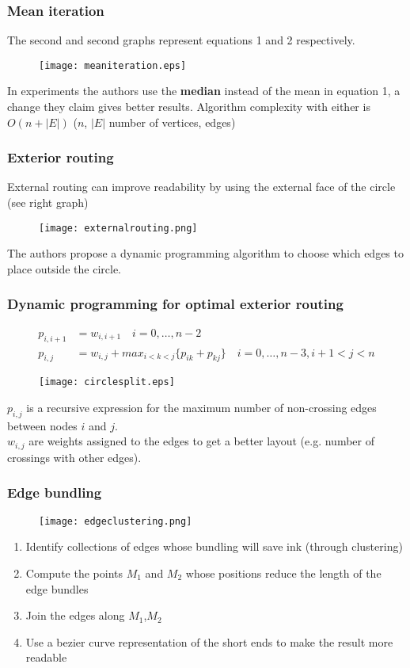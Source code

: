 \documentclass[12pt]{beamer}
\begin{document}
\begin{frame}
	\frametitle{Mean iteration}
	The second and second graphs represent equations 1 and 2 respectively. \\
	\begin{figure}
		\texttt{[image: meaniteration.eps]}
	\end{figure}
	In experiments the authors use the \textbf{median} instead of the mean in equation 1, a change they claim gives better results. Algorithm complexity with either is $O(n + |E|)$ ($n$, $|E|$ number of vertices, edges)
	
\end{frame}

\begin{frame}
	\frametitle{Exterior routing}
	External routing can improve readability by using the external face of the circle (see right graph)
	\begin{figure}
		\texttt{[image: externalrouting.png]}
	\end{figure}

	The authors propose a dynamic programming algorithm to choose which edges to place outside the circle.
\end{frame}

\begin{frame}
	\frametitle{Dynamic programming for optimal exterior routing}
	\footnotesize {
	\begin{align*}
		p_{i,i+1} &= w_{i,i+1} \quad i = 0, \ldots, n - 2 \\
		p_{i,j} &= w_{i,j} + max_{i<k<j}\{p_{ik} + p_{kj}\} \quad i = 0,\ldots,n-3, i + 1 < j < n
	\end{align*}
	}
	\begin{figure}
		\texttt{[image: circlesplit.eps]}
	\end{figure}
	$p_{i,j}$ is a recursive expression for the maximum number of non-crossing edges between nodes $i$ and $j$. \\
	$w_{i,j}$ are weights assigned to the edges to get a better layout (e.g. number of crossings with other edges).
\end{frame}

\begin{frame}
	\frametitle{Edge bundling}
	\begin{figure}
		\texttt{[image: edgeclustering.png]}
	\end{figure}
	\begin{enumerate}
		\item Identify collections of edges whose bundling will save ink (through clustering)
		\item Compute the points $M_{1}$ and $M_{2}$ whose positions reduce the length of the edge bundles
		\item Join the edges along $M_{1}$,$M_{2}$
		\item Use a bezier curve representation of the short ends to make the result more readable
	\end{enumerate}
\end{frame}
\end{document}
